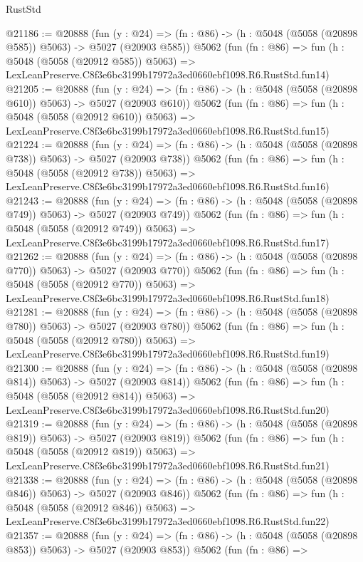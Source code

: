 \begin{lexlean}{RustStd}
\begin{coremodule}
@21186 := @20888
    (fun (y : @24) => (fn : @86) -> (h : @5048 (@5058 (@20898 @585)) @5063) -> @5027 (@20903 @585))
    @5062
    (fun (fn : @86) =>
    fun (h : @5048 (@5058 (@20912 @585)) @5063) =>
    LexLeanPreserve.C8f3e6bc3199b17972a3ed0660ebf1098.R6.RustStd.fun14)
@21205 := @20888
    (fun (y : @24) => (fn : @86) -> (h : @5048 (@5058 (@20898 @610)) @5063) -> @5027 (@20903 @610))
    @5062
    (fun (fn : @86) =>
    fun (h : @5048 (@5058 (@20912 @610)) @5063) =>
    LexLeanPreserve.C8f3e6bc3199b17972a3ed0660ebf1098.R6.RustStd.fun15)
@21224 := @20888
    (fun (y : @24) => (fn : @86) -> (h : @5048 (@5058 (@20898 @738)) @5063) -> @5027 (@20903 @738))
    @5062
    (fun (fn : @86) =>
    fun (h : @5048 (@5058 (@20912 @738)) @5063) =>
    LexLeanPreserve.C8f3e6bc3199b17972a3ed0660ebf1098.R6.RustStd.fun16)
@21243 := @20888
    (fun (y : @24) => (fn : @86) -> (h : @5048 (@5058 (@20898 @749)) @5063) -> @5027 (@20903 @749))
    @5062
    (fun (fn : @86) =>
    fun (h : @5048 (@5058 (@20912 @749)) @5063) =>
    LexLeanPreserve.C8f3e6bc3199b17972a3ed0660ebf1098.R6.RustStd.fun17)
@21262 := @20888
    (fun (y : @24) => (fn : @86) -> (h : @5048 (@5058 (@20898 @770)) @5063) -> @5027 (@20903 @770))
    @5062
    (fun (fn : @86) =>
    fun (h : @5048 (@5058 (@20912 @770)) @5063) =>
    LexLeanPreserve.C8f3e6bc3199b17972a3ed0660ebf1098.R6.RustStd.fun18)
@21281 := @20888
    (fun (y : @24) => (fn : @86) -> (h : @5048 (@5058 (@20898 @780)) @5063) -> @5027 (@20903 @780))
    @5062
    (fun (fn : @86) =>
    fun (h : @5048 (@5058 (@20912 @780)) @5063) =>
    LexLeanPreserve.C8f3e6bc3199b17972a3ed0660ebf1098.R6.RustStd.fun19)
@21300 := @20888
    (fun (y : @24) => (fn : @86) -> (h : @5048 (@5058 (@20898 @814)) @5063) -> @5027 (@20903 @814))
    @5062
    (fun (fn : @86) =>
    fun (h : @5048 (@5058 (@20912 @814)) @5063) =>
    LexLeanPreserve.C8f3e6bc3199b17972a3ed0660ebf1098.R6.RustStd.fun20)
@21319 := @20888
    (fun (y : @24) => (fn : @86) -> (h : @5048 (@5058 (@20898 @819)) @5063) -> @5027 (@20903 @819))
    @5062
    (fun (fn : @86) =>
    fun (h : @5048 (@5058 (@20912 @819)) @5063) =>
    LexLeanPreserve.C8f3e6bc3199b17972a3ed0660ebf1098.R6.RustStd.fun21)
@21338 := @20888
    (fun (y : @24) => (fn : @86) -> (h : @5048 (@5058 (@20898 @846)) @5063) -> @5027 (@20903 @846))
    @5062
    (fun (fn : @86) =>
    fun (h : @5048 (@5058 (@20912 @846)) @5063) =>
    LexLeanPreserve.C8f3e6bc3199b17972a3ed0660ebf1098.R6.RustStd.fun22)
@21357 := @20888
    (fun (y : @24) => (fn : @86) -> (h : @5048 (@5058 (@20898 @853)) @5063) -> @5027 (@20903 @853))
    @5062
    (fun (fn : @86) =>

\end{coremodule}
\end{lexlean}
